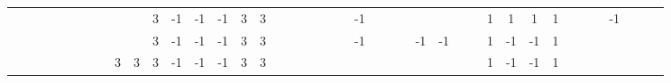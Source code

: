 \begin{table}[H]
{\begin{tabular}{ccccccccccccccccccccccccccccccccccccccccc}
   &    &                           &                           &                           &                           &                           &                           &                           &                           & \cellcolor[HTML]{3531FF}3 & -1                        & -1                        & -1                        & \cellcolor[HTML]{3531FF}3 & \cellcolor[HTML]{3531FF}3 &                           &                           &                           &                           &                           &                           & -1                        &    &    &    &                           &                           &                           &                           & \cellcolor[HTML]{329A9D}1 & \cellcolor[HTML]{329A9D}1 & \cellcolor[HTML]{329A9D}1 & \cellcolor[HTML]{329A9D}1 &                           &                           &                           & -1                        &  &  &  \\
   &    &                           &                           &                           &                           &                           &                           &                           &                           & \cellcolor[HTML]{3531FF}3 & -1                        & -1                        & -1                        & \cellcolor[HTML]{3531FF}3 & \cellcolor[HTML]{3531FF}3 &                           &                           &                           &                           &                           &                           & -1                        &    &    &    & -1                        & -1                        &                           &                           & \cellcolor[HTML]{329A9D}1 & -1                        & -1                        & \cellcolor[HTML]{329A9D}1 &                           &                           &                           &                           &  &  &  \\
   &    &                           &                           &                           &                           &                           &                           & \cellcolor[HTML]{3531FF}3 & \cellcolor[HTML]{3531FF}3 & \cellcolor[HTML]{3531FF}3 & -1                        & -1                        & -1                        & \cellcolor[HTML]{3531FF}3 & \cellcolor[HTML]{3531FF}3 &                           &                           &                           &                           &                           &                           &                           &    &    &    &                           &                           &                           &                           & \cellcolor[HTML]{329A9D}1 & -1                        & -1                        & \cellcolor[HTML]{329A9D}1 &                           &                           &                           &                           &  &  & 
\end{tabular}
}
\end{table}

